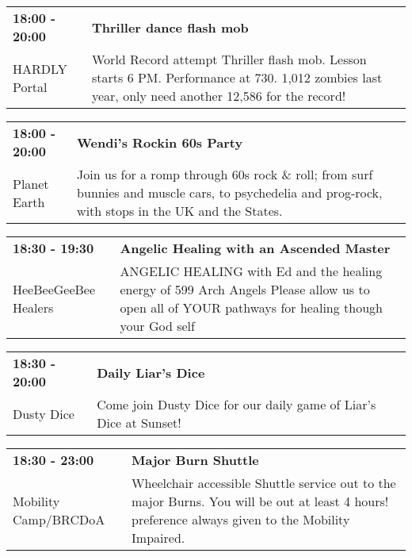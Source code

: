 \begin{tabular}{ p{1in} p{2.2in} }
    \textbf{18:00 - 20:00} & \textbf{Thriller dance flash mob} \\
    HARDLY \newline 430 Portal & World Record attempt Thriller flash mob.   Lesson starts 6 PM.  Performance at 730.  1,012 zombies last year, only need another 12,586 for the record! \\
    \hline 
\end{tabular}
    
\begin{tabular}{ p{1in} p{2.2in} }
    \textbf{18:00 - 20:00} & \textbf{Wendi's Rockin 60s Party} \\
    Planet Earth \newline  & Join us for a romp through 60s rock \& roll; from surf bunnies and muscle cars, to psychedelia and prog-rock, with stops in the UK and the States. \\
    \hline 
\end{tabular}
    
\begin{tabular}{ p{1in} p{2.2in} }
    \textbf{18:30 - 19:30} & \textbf{Angelic Healing with an Ascended Master} \\
    HeeBeeGeeBee Healers \newline  & ANGELIC HEALING with Ed and the healing energy of 599 Arch Angels  Please allow us to open all of YOUR pathways for healing though your God self \\
    \hline 
\end{tabular}
    
\begin{tabular}{ p{1in} p{2.2in} }
    \textbf{18:30 - 20:00} & \textbf{Daily Liar's Dice} \\
    Dusty Dice \newline  & Come join Dusty Dice for our daily game of Liar's Dice at Sunset! \\
    \hline 
\end{tabular}
    
\begin{tabular}{ p{1in} p{2.2in} }
    \textbf{18:30 - 23:00} & \textbf{Major Burn Shuttle} \\
    Mobility Camp/BRCDoA \newline  & Wheelchair accessible Shuttle service out to the major Burns. You will be out at least 4 hours! preference always given to the Mobility Impaired. \\
    \hline 
\end{tabular}
    
